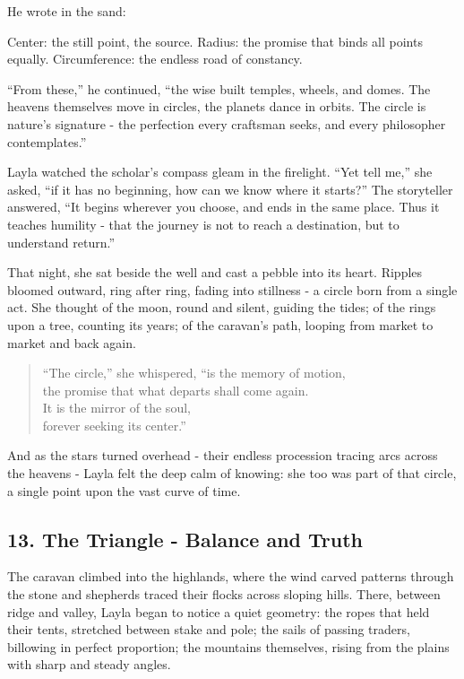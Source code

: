 \documentclass[
  letterpaper,
  DIV=11,
  numbers=noendperiod]{scrreprt}
\begin{document}
He wrote in the sand:

Center: the still point, the source. Radius: the promise that binds all
points equally. Circumference: the endless road of constancy.

``From these,'' he continued, ``the wise built temples, wheels, and
domes. The heavens themselves move in circles, the planets dance in
orbits. The circle is nature's signature - the perfection every
craftsman seeks, and every philosopher contemplates.''

Layla watched the scholar's compass gleam in the firelight. ``Yet tell
me,'' she asked, ``if it has no beginning, how can we know where it
starts?'' The storyteller answered, ``It begins wherever you choose, and
ends in the same place. Thus it teaches humility - that the journey is
not to reach a destination, but to understand return.''

That night, she sat beside the well and cast a pebble into its heart.
Ripples bloomed outward, ring after ring, fading into stillness - a
circle born from a single act. She thought of the moon, round and
silent, guiding the tides; of the rings upon a tree, counting its years;
of the caravan's path, looping from market to market and back again.

\begin{quote}
``The circle,'' she whispered, ``is the memory of motion,\\
the promise that what departs shall come again.\\
It is the mirror of the soul,\\
forever seeking its center.''
\end{quote}

And as the stars turned overhead - their endless procession tracing arcs
across the heavens - Layla felt the deep calm of knowing: she too was
part of that circle, a single point upon the vast curve of time.

\subsection{13. The Triangle - Balance and
Truth}\label{the-triangle---balance-and-truth}

The caravan climbed into the highlands, where the wind carved patterns
through the stone and shepherds traced their flocks across sloping
hills. There, between ridge and valley, Layla began to notice a quiet
geometry: the ropes that held their tents, stretched between stake and
pole; the sails of passing traders, billowing in perfect proportion; the
mountains themselves, rising from the plains with sharp and steady
angles.
\end{document}
